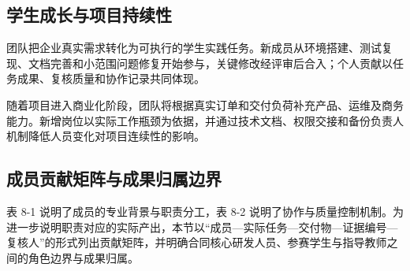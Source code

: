 \subsection{学生成长与项目持续性}\label{sec:8.1.3}
团队把企业真实需求转化为可执行的学生实践任务。新成员从环境搭建、测试复现、文档完善和小范围问题修复开始参与，关键修改经评审后合入；个人贡献以任务成果、复核质量和协作记录共同体现。

随着项目进入商业化阶段，团队将根据真实订单和交付负荷补充产品、运维及商务能力。新增岗位以实际工作瓶颈为依据，并通过技术文档、权限交接和备份负责人机制降低人员变化对项目连续性的影响。

\subsection{成员贡献矩阵与成果归属边界}\label{sec:8.1.4}
表 8-1 说明了成员的专业背景与职责分工，表 8-2 说明了协作与质量控制机制。为进一步说明职责对应的实际产出，本节以“成员---实际任务---交付物---证据编号---复核人”的形式列出贡献矩阵，并明确合同核心研发人员、参赛学生与指导教师之间的角色边界与成果归属。

